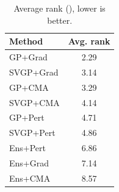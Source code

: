 \begin{table}[t]\centering
\caption{Average rank (), lower is better.}
\label{tab:grid_rank}
\begin{tabular}{lc}
\toprule
Method & Avg. rank \\
\midrule
GP+Grad & 2.29 \\
SVGP+Grad & 3.14 \\
GP+CMA & 3.29 \\
SVGP+CMA & 4.14 \\
GP+Pert & 4.71 \\
SVGP+Pert & 4.86 \\
Ens+Pert & 6.86 \\
Ens+Grad & 7.14 \\
Ens+CMA & 8.57 \\
\bottomrule
\end{tabular}
\end{table}